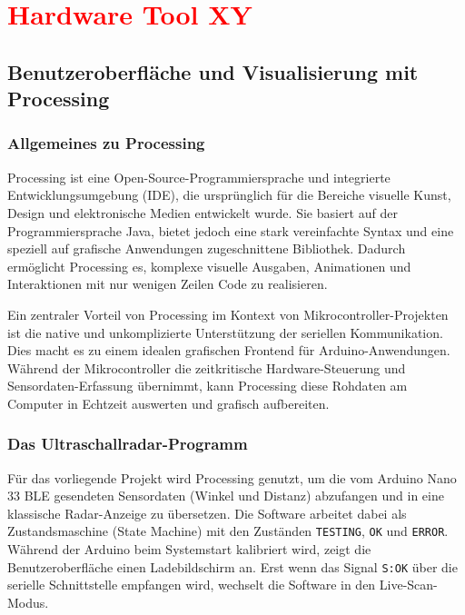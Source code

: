 %
%
%


\chapter{\textcolor{red}{Hardware Tool XY}}

\section{Benutzeroberfläche und Visualisierung mit Processing}

\subsection{Allgemeines zu Processing}
Processing ist eine Open-Source-Programmiersprache und integrierte Entwicklungsumgebung (IDE), die ursprünglich für die Bereiche visuelle Kunst, Design und elektronische Medien entwickelt wurde. Sie basiert auf der Programmiersprache Java, bietet jedoch eine stark vereinfachte Syntax und eine speziell auf grafische Anwendungen zugeschnittene Bibliothek. Dadurch ermöglicht Processing es, komplexe visuelle Ausgaben, Animationen und Interaktionen mit nur wenigen Zeilen Code zu realisieren. 

Ein zentraler Vorteil von Processing im Kontext von Mikrocontroller-Projekten ist die native und unkomplizierte Unterstützung der seriellen Kommunikation. Dies macht es zu einem idealen grafischen Frontend für Arduino-Anwendungen. Während der Mikrocontroller die zeitkritische Hardware-Steuerung und Sensordaten-Erfassung übernimmt, kann Processing diese Rohdaten am Computer in Echtzeit auswerten und grafisch aufbereiten.

\subsection{Das Ultraschallradar-Programm}
Für das vorliegende Projekt wird Processing genutzt, um die vom Arduino Nano 33 BLE gesendeten Sensordaten (Winkel und Distanz) abzufangen und in eine klassische Radar-Anzeige zu übersetzen. Die Software arbeitet dabei als Zustandsmaschine (State Machine) mit den Zuständen \texttt{TESTING}, \texttt{OK} und \texttt{ERROR}. Während der Arduino beim Systemstart kalibriert wird, zeigt die Benutzeroberfläche einen Ladebildschirm an. Erst wenn das Signal \texttt{S:OK} über die serielle Schnittstelle empfangen wird, wechselt die Software in den Live-Scan-Modus.

